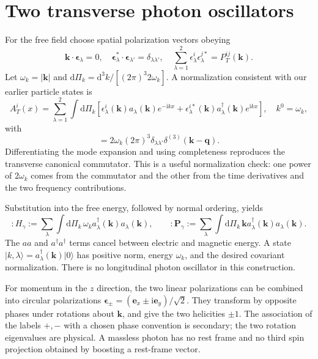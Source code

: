 \documentclass[11pt]{article}
\newcommand{\dd}{\mathrm d}
\newcommand{\ii}{\mathrm i}
\newcommand{\vac}{\lvert0\rangle}
\newcommand{\ket}[1]{\lvert#1\rangle}
\newcommand{\module}[1]{\clearpage\section{#1}}
\begin{document}
\module{Two transverse photon oscillators}
For the free field choose spatial polarization vectors obeying
\begin{equation}
 \bm k\cdot\bm\epsilon_\lambda=0,\quad
 \bm\epsilon_\lambda^*\cdot\bm\epsilon_{\lambda'}=\delta_{\lambda\lambda'},
 \quad \sum_{\lambda=1}^2\epsilon_\lambda^i\epsilon_\lambda^{j*}
 =P_T^{ij}(\bm k).
\end{equation}
Let \(\omega_k=|\bm k|\) and
\(\dd\Pi_k=\dd^3k/[(2\pi)^3 2\omega_k]\). A normalization consistent
with our earlier particle states is
\begin{equation}
 A_T^i(x)=\sum_{\lambda=1}^2\int\dd\Pi_k
 \left[\epsilon_\lambda^i(\bm k)a_\lambda(\bm k)e^{-\ii kx}
 +\epsilon_\lambda^{i*}(\bm k)a_\lambda^\dagger(\bm k)e^{\ii kx}\right],
 \quad k^0=\omega_k,
\end{equation}
with
\begin{equation}
 [a_\lambda(\bm k),a_{\lambda'}^\dagger(\bm q)]
 =2\omega_k(2\pi)^3\delta_{\lambda\lambda'}\delta^{(3)}(\bm k-\bm q).
\end{equation}
Differentiating the mode expansion and using completeness reproduces the
transverse canonical commutator. This is a useful normalization check:
one power of \(2\omega_k\) comes from the commutator and the other from
the time derivatives and the two frequency contributions.

Substitution into the free energy, followed by normal ordering, yields
\begin{equation}
 :H_\gamma:=\sum_\lambda\int\dd\Pi_k\,
 \omega_k a_\lambda^\dagger(\bm k)a_\lambda(\bm k),\qquad
 :\bm P_\gamma:=\sum_\lambda\int\dd\Pi_k\,
 \bm k a_\lambda^\dagger(\bm k)a_\lambda(\bm k).
\end{equation}
The \(aa\) and \(a^\dagger a^\dagger\) terms cancel between electric and
magnetic energy. A state \(\ket{k,\lambda}=a_\lambda^\dagger(\bm k)\vac\)
has positive norm, energy \(\omega_k\), and the desired covariant
normalization. There is no longitudinal photon oscillator in this construction.

For momentum in the \(z\) direction, the two linear polarizations can be
combined into circular polarizations
\(\bm\epsilon_\pm=(\bm e_x\pm\ii\bm e_y)/\sqrt2\).
They transform by opposite phases under rotations about \(\bm k\), and
give the two helicities \(\pm1\). The association of the labels \(+,-\)
with a chosen phase convention is secondary; the two rotation eigenvalues
are physical. A massless photon has no rest frame and no third spin
projection obtained by boosting a rest-frame vector.
\end{document}

